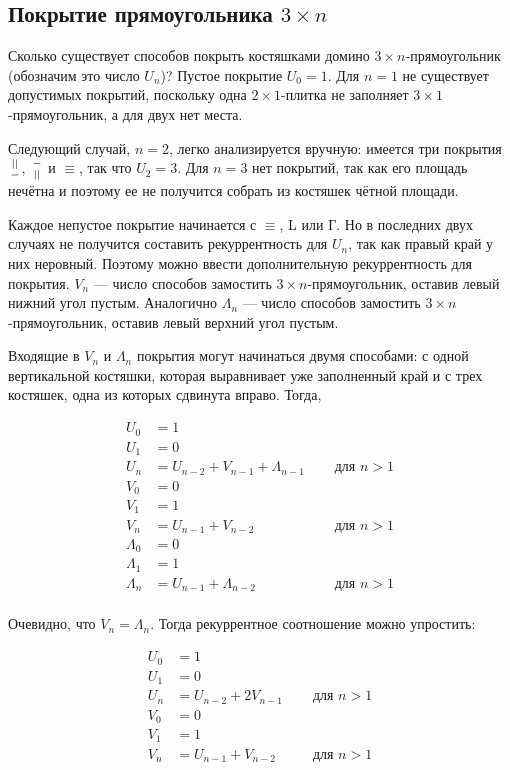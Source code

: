 \documentclass[14pt]{book}
\begin{document}
\subsection{Покрытие прямоугольника $3\times n$}

Сколько существует способов покрыть костяшками домино $3 \times n$-прямоугольник
(обозначим это число $U_n$)? Пустое покрытие $U_0 = 1$. Для $n=1$ не существует допустимых
покрытий, поскольку одна $2\times 1$-плитка не заполняет $3 \times 1$-прямоугольник,
а для двух нет места.

Следующий случай, $n=2$, легко анализируется вручную: имеется три покрытия ${||}\atop{-}$,
${-}\atop{||}$ и $\equiv$, так что $U_2 = 3$. Для $n=3$ нет покрытий, так как его
площадь нечётна и поэтому ее не получится собрать из костяшек чётной площади.

Каждое непустое покрытие начинается с $\equiv$, L или Г. Но в последних двух случаях
не получится составить рекуррентность для $U_n$, так как правый край у них неровный.
Поэтому можно ввести дополнительную рекуррентность для покрытия. $V_n$  --- число
способов замостить $3\times n$-прямоугольник, оставив левый нижний угол пустым.
Аналогично $\Lambda_n$ --- число
способов замостить $3\times n$-прямоугольник, оставив левый верхний угол пустым.

Входящие в $V_n$ и $\Lambda_n$ покрытия могут начинаться двумя способами: с одной вертикальной
костяшки, которая выравнивает уже заполненный край и с трех костяшек, одна из которых сдвинута вправо.
Тогда,

\begin{align*}
U_0 &= 1 \\
U_1 &= 0 \\
U_n &= U_{n-2} + V_{n-1} + \Lambda_{n-1} \quad & \text{ для $n>1$}\\
V_0 &= 0 \\
V_1 &= 1 \\
V_n &= U_{n-1} + V_{n-2} & \text{ для $n>1$}\\
\Lambda_0 &= 0 \\
\Lambda_1 &= 1 \\
\Lambda_n &= U_{n-1} + \Lambda_{n-2} & \text{ для $n>1$}\\
\end{align*}

Очевидно, что $V_n = \Lambda_n$. Тогда рекуррентное соотношение можно упростить:

\begin{align*}
U_0 &= 1 \\
U_1 &= 0 \\
U_n &= U_{n-2} + 2V_{n-1} \quad & \text{ для $n>1$}\\
V_0 &= 0 \\
V_1 &= 1 \\
V_n &= U_{n-1} + V_{n-2} & \text{ для $n>1$}\\
\end{align*}
\end{document}
